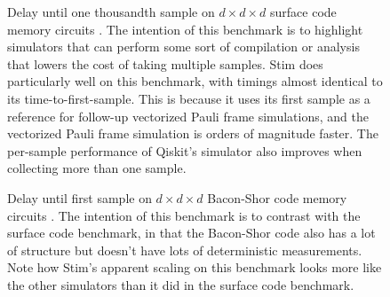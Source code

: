 \documentclass[onecolumn,unpublished]{quantumarticle}
\theoremstyle{definition}
\theoremstyle{definition}
\theoremstyle{definition}
\begin{document}
\begin{figure}
    \centering
    \caption{
        Delay until one thousandth sample on $d \times d \times d$ surface code memory circuits \cite{horsman2012latticesurgery}.
        The intention of this benchmark is to highlight simulators that can perform some sort of compilation or analysis that lowers the cost of taking multiple samples.
        Stim does particularly well on this benchmark, with timings almost identical to its time-to-first-sample.
        This is because it uses its first sample as a reference for follow-up vectorized Pauli frame simulations, and the vectorized Pauli frame simulation is orders of magnitude faster.
        The per-sample performance of Qiskit's simulator also improves when collecting more than one sample.
    }
    \label{fig:bench-surface-1000}
\end{figure}

\begin{figure}
    \centering
    \caption{
        Delay until first sample on $d \times d \times d$ Bacon-Shor code memory circuits \cite{bacon2006operator}.
        The intention of this benchmark is to contrast with the surface code benchmark, in that the Bacon-Shor code also has a lot of structure but doesn't have lots of deterministic measurements.
        Note how Stim's apparent scaling on this benchmark looks more like the other simulators than it did in the surface code benchmark.
    }
    \label{fig:bench-bacon}
\end{figure}
\end{document}
